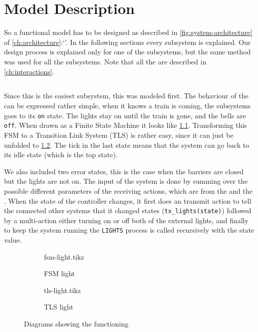 \documentclass[final]{report}
\begin{document}
\chapter{Model Description}
So a functional model has to be designed as described in \cref{fig:system-architecture} of \cref{ch:architecture}:`'.
In the following sections every subsystem is explained.
Our design process is explained only for one of the subsystems, but the same method was used for all the subsystems.
Note that all the  are described in \cref{ch:interactions}.


\section{}
Since this is the easiest subsystem, this was modeled first.
The behaviour of the  can be expressed rather simple, when it knows a train is coming, the subsystems goes to its \texttt{on} state.
The lights stay on until the train is gone, and the bells are \texttt{off}.
When drawn as a Finite State Machine it looks like \cref{fig:fsm-light-model}.
Transforming this FSM to a Transition Link System (TLS) is rather easy, since it can just be unfolded to \cref{fig:tls-light-model}.
The tick in the last state means that the system can go back to its idle state (which is the top state).

We also included two error states, this is the case when the barriers are closed but the lights are not on.
The input of the system is done by summing over the possible different parameters of the receiving actions, which are from the  and the .
When the state of the controller changes, it first does an transmit action to tell the connected other systems that it changed states (\texttt{tx\_lights(state)}) followed by a multi-action either turning on or off both of the external lights, and finally to keep the system running the \texttt{LIGHTS} process is called recursively with the state value.

\begin{figure}[H]
    \centering
        \begin{subfigure}[b]{0.4\textwidth}
    \centering
            {fsm-light.tikz}
            \caption{FSM light}
            \label{fig:fsm-light-model}
        \end{subfigure}
        \begin{subfigure}[b]{0.4\textwidth}
    \centering
            {tls-light.tikz}
            \caption{TLS light}
            \label{fig:tls-light-model}
        \end{subfigure}
    \caption{Diagrams showing the functioning }
    \label{fig:light}
\end{figure}
\end{document}

